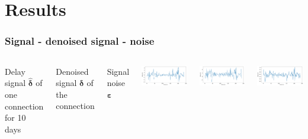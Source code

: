 \documentclass{beamer}
\begin{document}
\section{Results}
\begin{frame}
\frametitle{Signal - denoised signal - noise}
\begin{columns}
Delay signal $\bm{\hat{\delta}}$ of one connection for 10 days

\vspace{1.8cm}

Denoised signal $\bm{\delta}$ of the connection

\vspace{1.8cm}

Signal noise $\bm{\varepsilon}$

\includegraphics[height=0.28\textheight]{noisy-time-delay-data-10-days.png}

\includegraphics[height=0.28\textheight]{denoised-time-delay-data-ten-days.png}

\includegraphics[height=0.28\textheight]{the-noise-ten-days.png}

\end{columns}

\end{frame}
\end{document}
